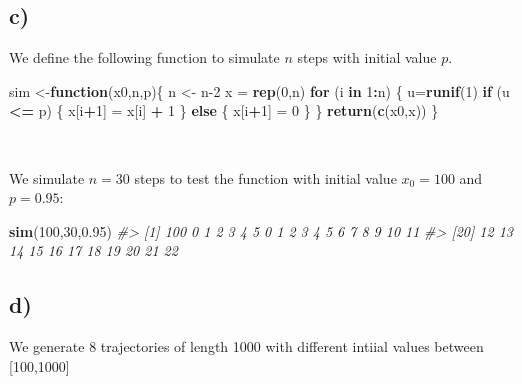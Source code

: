 \documentclass[]{article}
\newenvironment{Shaded}{\begin{snugshade}}{\end{snugshade}}
\newcommand{\CommentTok}[1]{\textcolor[rgb]{0.56,0.35,0.01}{\textit{#1}}}
\newcommand{\ControlFlowTok}[1]{\textcolor[rgb]{0.13,0.29,0.53}{\textbf{#1}}}
\newcommand{\DecValTok}[1]{\textcolor[rgb]{0.00,0.00,0.81}{#1}}
\newcommand{\FloatTok}[1]{\textcolor[rgb]{0.00,0.00,0.81}{#1}}
\newcommand{\KeywordTok}[1]{\textcolor[rgb]{0.13,0.29,0.53}{\textbf{#1}}}
\newcommand{\NormalTok}[1]{#1}
\newcommand{\OperatorTok}[1]{\textcolor[rgb]{0.81,0.36,0.00}{\textbf{#1}}}
\newcommand{\StringTok}[1]{\textcolor[rgb]{0.31,0.60,0.02}{#1}}
\begin{document}
\hypertarget{c-1}{%
\subsection{c)}\label{c-1}}

We define the following function to simulate \(n\) steps with initial
value \(p\).

\begin{Shaded}
\begin{Highlighting}[]
\NormalTok{sim <-}\ControlFlowTok{function}\NormalTok{(x0,n,p)\{ }
\NormalTok{    n <-}\StringTok{ }\NormalTok{n}\DecValTok{-2}
\NormalTok{    x =}\StringTok{ }\KeywordTok{rep}\NormalTok{(}\DecValTok{0}\NormalTok{,n)}
    \ControlFlowTok{for}\NormalTok{ (i }\ControlFlowTok{in} \DecValTok{1}\OperatorTok{:}\NormalTok{n) \{}
\NormalTok{        u=}\KeywordTok{runif}\NormalTok{(}\DecValTok{1}\NormalTok{) }
        \ControlFlowTok{if}\NormalTok{ (u }\OperatorTok{<=}\StringTok{ }\NormalTok{p) \{}
\NormalTok{            x[i}\OperatorTok{+}\DecValTok{1}\NormalTok{] =}\StringTok{ }\NormalTok{x[i] }\OperatorTok{+}\StringTok{ }\DecValTok{1}
\NormalTok{        \} }\ControlFlowTok{else}\NormalTok{ \{}
\NormalTok{            x[i}\OperatorTok{+}\DecValTok{1}\NormalTok{] =}\StringTok{ }\DecValTok{0}
\NormalTok{        \}}
\NormalTok{    \} }
    \KeywordTok{return}\NormalTok{(}\KeywordTok{c}\NormalTok{(x0,x))}
\NormalTok{\}}
\end{Highlighting}
\end{Shaded}

~

We simulate \(n=30\) steps to test the function with initial value
\(x_{0} = 100\) and \(p=0.95\):

\begin{Shaded}
\begin{Highlighting}[]
\KeywordTok{sim}\NormalTok{(}\DecValTok{100}\NormalTok{,}\DecValTok{30}\NormalTok{,}\FloatTok{0.95}\NormalTok{)}
\CommentTok{#>  [1] 100   0   1   2   3   4   5   0   1   2   3   4   5   6   7   8   9  10  11}
\CommentTok{#> [20]  12  13  14  15  16  17  18  19  20  21  22}
\end{Highlighting}
\end{Shaded}

\hypertarget{d-1}{%
\subsection{d)}\label{d-1}}

We generate 8 trajectories of length 1000 with different intiial values
between {[}100,1000{]}
\end{document}
